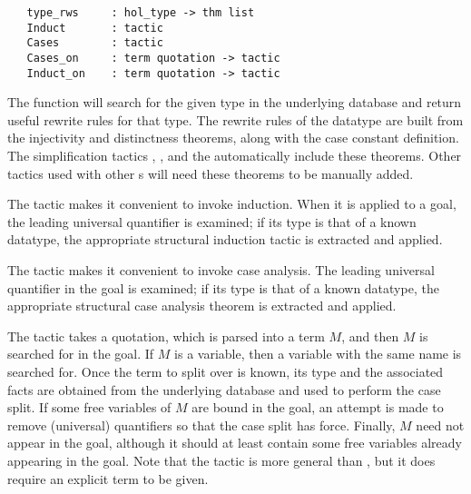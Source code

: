 \begin{verbatim}
   type_rws     : hol_type -> thm list
   Induct       : tactic
   Cases        : tactic
   Cases_on     : term quotation -> tactic
   Induct_on    : term quotation -> tactic
\end{verbatim}

%
The function  will search for the given type in the
underlying  database and return useful rewrite rules for
that type. The rewrite rules of the datatype are built from the
injectivity and distinctness theorems, along with the case constant
definition. The simplification tactics , ,
and the \simpset{}  automatically include these
theorems.  Other tactics used with other \simpset{}s will need these
theorems to be manually added.

%
The  tactic makes it convenient to invoke induction. When
it is applied to a goal, the leading universal quantifier is examined;
if its type is that of a known datatype, the appropriate structural
induction tactic is extracted and applied.

The  tactic makes it convenient to invoke case
analysis. The leading universal quantifier in the goal is examined; if
its type is that of a known datatype, the appropriate structural
case analysis theorem is extracted and applied.

The  tactic takes a quotation, which is
parsed into a term $M$, and then $M$ is searched for in the goal. If $M$
is a variable, then a variable with the same name is searched for. Once
the term to split over is known, its type and the associated facts are
obtained from the underlying database and used to perform the case
split. If some free variables of $M$ are bound in the goal, an attempt
is made to remove (universal) quantifiers so that the case split has
force. Finally, $M$ need not appear in the goal, although it should at
least contain some free variables already appearing in the goal. Note
that the  tactic is more general than , but
it does require an explicit term to be given.

